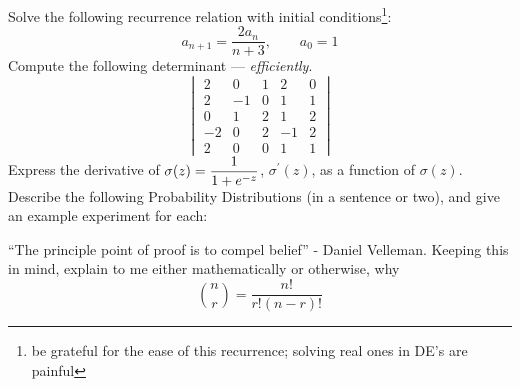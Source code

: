 \documentclass[12pt,dvipsnames,addpoints]{exam}
\begin{document}
\begin{questions}
    \question[3] Solve the following recurrence relation with initial conditions\footnote{be grateful for the ease of this recurrence; solving real ones in DE's are painful}:
    \[a_{n+1} = \frac{2a_n}{n+3},\qquad a_0=1\]
    \question[3] Compute the following determinant --- \emph{efficiently}.
    \[\begin{vmatrix}
        2&0&1&2&0\\
        2&-1&0&1&1\\
        0&1&2&1&2\\
        -2&0&2&-1&2\\
        2&0&0&1&1
    \end{vmatrix}\]
    \question[2] Express the derivative of $\mathlarger{\sigma(z) = \frac{1}{1+e^{-z}}}$, $\sigma^{'}(z)$, as a function of $\sigma(z)$.
    \question[5] Describe the following Probability Distributions (in a sentence or two), and give an example experiment for each:
    \question[2] ``The principle point of proof is to compel belief'' - Daniel Velleman. Keeping this in mind, explain to me either mathematically or otherwise, why \[{n\choose r} = \frac{n!}{r!(n-r)!}\]
\end{questions}
        
\end{document}
